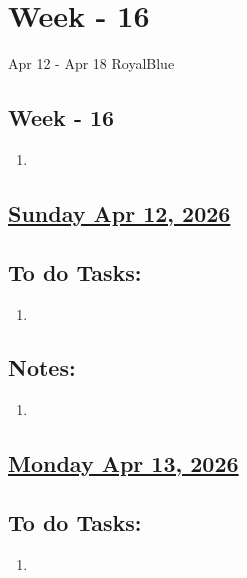 \section{Week - 16}
\begin{physicsmodule}{Apr 12 - Apr 18 }{RoyalBlue}
  \begin{lawbox}
    \subsection*{ Week - 16}
    \begin{enumerate}
    \item 
\end{enumerate}
  \end{lawbox}
\end{physicsmodule}
\subsection*{\underline{Sunday Apr 12, 2026}}
\subsection*{To do Tasks:}
\begin{enumerate}
    \item 
\end{enumerate}
\subsection*{Notes:}
\begin{enumerate}
    \item 
\end{enumerate}
\subsection*{\underline{Monday Apr 13, 2026}}
\subsection*{To do Tasks:}
\begin{enumerate}
    \item 
\end{enumerate}
